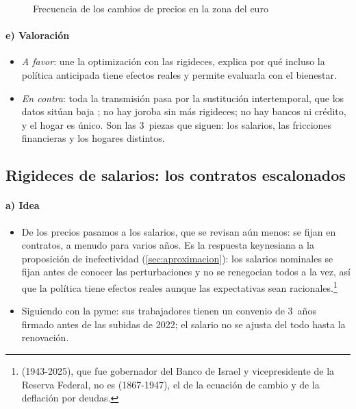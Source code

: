 \documentclass[11pt]{article}
\begin{document}
\begin{figure}[H]
\centering
\caption{Frecuencia de los cambios de precios en la zona del euro}\label{fig:frecuencia-precios}
\end{figure}

\paragraph{e) Valoración}
\begin{itemize}
\item \emph{A favor}: une la optimización con las rigideces, explica por qué incluso la política anticipada tiene efectos reales y permite evaluarla con el bienestar.
\item \emph{En contra}: toda la transmisión pasa por la sustitución intertemporal, que los datos sitúan baja ; no hay joroba sin más rigideces; no hay bancos ni crédito, y el hogar es único. Son las 3~piezas que siguen: los salarios, las fricciones financieras y los hogares distintos.
\end{itemize}

\subsection{Rigideces de salarios: los contratos escalonados}\label{sec:salarios}

\paragraph{a) Idea}
\begin{itemize}
\item De los precios pasamos a los salarios, que se revisan aún menos: se fijan en contratos, a menudo para varios años. Es la respuesta keynesiana a la proposición de inefectividad (\ref{sec:aproximacion}): los salarios nominales se fijan antes de conocer las perturbaciones y no se renegocian todos a la vez, así que la política tiene efectos reales aunque las expectativas sean racionales.\footnote{ (1943-2025), que fue gobernador del Banco de Israel y vicepresidente de la Reserva Federal, no es  (1867-1947), el de la ecuación de cambio y de la deflación por deudas.}
\item Siguiendo con la pyme: sus trabajadores tienen un convenio de 3~años firmado antes de las subidas de 2022; el salario no se ajusta del todo hasta la renovación.
\end{itemize}
\end{document}
